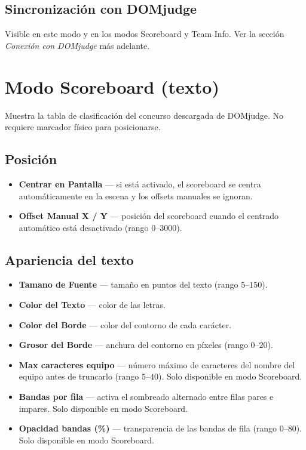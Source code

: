 \subsection*{Sincronización con DOMjudge}

Visible en este modo y en los modos Scoreboard y Team Info. Ver la sección \textit{Conexión con DOMjudge} más adelante.

\section*{Modo Scoreboard (texto)}

Muestra la tabla de clasificación del concurso descargada de DOMjudge. No requiere marcador físico para posicionarse.

\subsection*{Posición}

\begin{itemize}
  \item \textbf{Centrar en Pantalla} — si está activado, el scoreboard se centra automáticamente en la escena y los offsets manuales se ignoran.
  \item \textbf{Offset Manual X / Y} — posición del scoreboard cuando el centrado automático está desactivado (rango $0$--$3000$).
\end{itemize}

\subsection*{Apariencia del texto}

\begin{itemize}
  \item \textbf{Tamano de Fuente} — tamaño en puntos del texto (rango $5$--$150$).
  \item \textbf{Color del Texto} — color de las letras.
  \item \textbf{Color del Borde} — color del contorno de cada carácter.
  \item \textbf{Grosor del Borde} — anchura del contorno en píxeles (rango $0$--$20$).
  \item \textbf{Max caracteres equipo} — número máximo de caracteres del nombre del equipo antes de truncarlo (rango $5$--$40$). Solo disponible en modo Scoreboard.
  \item \textbf{Bandas por fila} — activa el sombreado alternado entre filas pares e impares. Solo disponible en modo Scoreboard.
  \item \textbf{Opacidad bandas (\%)} — transparencia de las bandas de fila (rango $0$--$80$). Solo disponible en modo Scoreboard.
\end{itemize}

